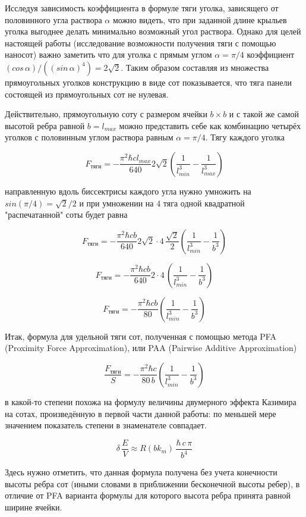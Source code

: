 \documentclass[11pt]{article}
\begin{document}
    Исследуя зависимость коэффициента в формуле тяги уголка, зависящего от
половинного угла раствора \(\alpha\) можно видеть, что при заданной
длине крыльев уголка выгоднее делать минимально возможный угол раствора.
Однако для целей настоящей работы (исследование возможности получения
тяги с помощью наносот) важно заметить что для уголка с прямым углом
\(\alpha = {\pi}/{4}\) коэффициент
\(\left({cos\, \alpha}\right)\big/\left({\left(sin\, \alpha\right)^4}\right) = 2\sqrt{2}\).
Таким образом составляя из множества прямоугольных уголков конструкцию в
виде сот показывается, что тяга панели состоящей из прямоугольных сот не
нулевая.

Действительно, прямоугольную соту с размером ячейки \(b \times b\) и с
такой же самой высотой ребра равной \(b = l_{max}\) можно представить
себе как комбинацию четырёх уголков с половинным углом раствора равным
\(\alpha = {\pi}/{4}\). Тягу каждого уголка

\[F_{тяги} = - \frac{\pi^2\hbar c l_{max}}{640} 2\sqrt{2} \left(\frac{1}{l_{min}^3} - \frac{1}{l_{max}^3}\right)\]

направленную вдоль биссектрисы каждого угла нужно умножить на
\(sin\left({\pi}/{4}\right)={\sqrt{2}}\big/{2}\) и при умножении на 4
тяга одной квадратной "распечатанной" соты будет равна

\[F_{тяги} = - \frac{\pi^2\hbar c b}{640} 2\sqrt{2}\cdot4\,\frac{\sqrt{2}}{2} \left(\frac{1}{l_{min}^3} - \frac{1}{b^3}\right)\]

\[F_{тяги} = - \frac{\pi^2\hbar c b}{640} 2\cdot4\,\left(\frac{1}{l_{min}^3} - \frac{1}{b^3}\right)\]

\[F_{тяги} = - \frac{\pi^2\hbar c b}{80} \left(\frac{1}{l_{min}^3} - \frac{1}{b^3}\right)\]

Итак, формула для удельной тяги сот, полученная с помощью метода PFA
(Proximity Force Approximation), или PAA (Pairwise Additive
Approximation)

\[\frac{F_{тяги}}{S} = - \frac{\pi^2\hbar c}{80\, b} \left(\frac{1}{l_{min}^3} - \frac{1}{b^3}\right)\]

в какой-то степени похожа на формулу величины двумерного эффекта
Казимира на сотах, произведённую в первой части данной работы: по
меньшей мере значением показатель степени в знаменателе совпадает.

\[\delta\,\frac{E}{V} \approx R\left(b k_m\right)\,\frac{\hbar\,c\,\pi}{b^4}\]

Здесь нужно отметить, что данная формула получена без учета конечности
высоты ребра сот (иными словами в приближении бесконечной высоты ребер),
в отличие от PFA варианта формулы для которого высота ребра принята
равной ширине ячейки.
\end{document}
